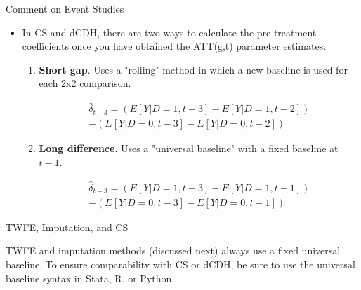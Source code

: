 \documentclass{beamer}
\begin{document}
\begin{frame}{Comment on Event Studies}

\begin{itemize}

\item In CS and dCDH, there are two ways to calculate the pre-treatment coefficients once you have obtained the ATT(g,t) parameter estimates:
	\begin{enumerate}
	\item \textbf{Short gap}. Uses a "rolling" method in which a new baseline is used for each 2x2 comparison.
	
	\begin{eqnarray*}
	 \widehat{\delta}_{t-3} = \left( E[Y|D=1, t-3] - E[Y|D=1, t-2] \right) \\
	 - \left( E[Y|D=0, t-3] - E[Y|D=0, t-2] \right)
	 \end{eqnarray*}
	 
	\item \textbf{Long difference}. Uses a "universal baseline" with a fixed baseline at \( t-1 \).
	
	\begin{eqnarray*}
	 \widehat{\delta}_{t-3} = \left( E[Y|D=1, t-3] - E[Y|D=1, t-1] \right) \\
	 - \left( E[Y|D=0, t-3] - E[Y|D=0, t-1] \right)
	 \end{eqnarray*}

	\end{enumerate}
\end{itemize}

\end{frame}

\begin{frame}{TWFE, Imputation, and CS}

TWFE and imputation methods (discussed next) always use a fixed universal baseline. To ensure comparability with CS or dCDH, be sure to use the universal baseline syntax in Stata, R, or Python.

\end{frame}
\end{document}
